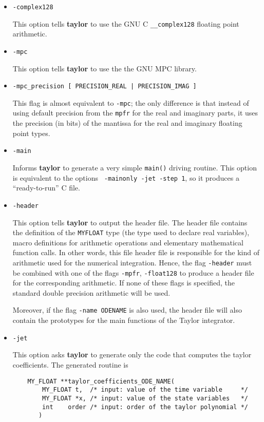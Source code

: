 \documentclass[10pt]{article}
\theoremstyle{remark}
\newcommand{\taylorname}{{\bf taylor}}
\newcommand{\myfloat}{{\tt MY\symbol{95}FLOAT}}
\begin{document}
\begin{itemize}
\item{\verb+-complex128+

This option tells \taylorname{} to use the GNU C \verb+__complex128+
floating point arithmetic.  }

\item{\verb+-mpc+ 

This option tells \taylorname{} to use the the GNU MPC library.  }

\item{\verb+-mpc_precision [ PRECISION_REAL | PRECISION_IMAG ]+

This flag is almost equivalent to {\tt -mpc}; the only difference is
that instead of using default precision from the \verb+mpfr+ for the
real and imaginary parts, it uses the precision (in bits) of the
mantissa for the real and imaginary floating point types.}

\item{\verb+-main+

Informs \taylorname{} to generate a very simple \verb+main()+ driving
routine. This option is equivalent to the options {\tt
  -mainonly -jet -step 1}, so it produces a
``ready-to-run'' C file.  }

\item{\verb+-header+ 

This option tells \taylorname{} to output the header file. The header
file contains the definition of the \myfloat{} type (the type used to
declare real variables), macro definitions for arithmetic operations
and elementary mathematical function calls. In other words, this file
header file is responsible for the kind of arithmetic used for the
numerical integration.  Hence, the flag {\tt -header} must be combined
with one of the flags {\tt -mpfr}, {\tt -float128} to produce a header
file for the corresponding arithmetic. If none of these flags is
specified, the standard double precision arithmetic will be used.

Moreover, if the flag {\tt -name ODENAME} is also used, the
header file will also contain the prototypes for the main functions of
the Taylor integrator.}

\item{\verb+-jet+

This option asks \taylorname{} to generate only the code that computes
the taylor coefficients. The generated routine is

\begin{verbatim}
    MY_FLOAT **taylor_coefficients_ODE_NAME(
        MY_FLOAT t,  /* input: value of the time variable     */
        MY_FLOAT *x, /* input: value of the state variables   */
        int    order /* input: order of the taylor polynomial */
       )
\end{verbatim}

}
\end{itemize}
\end{document}
